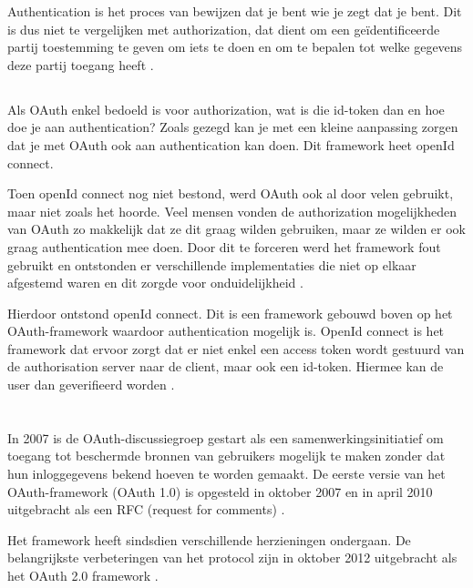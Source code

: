 Authentication is het proces van bewijzen dat je bent wie je zegt dat je bent. Dit is dus niet te vergelijken met authorization, dat dient om een geïdentificeerde partij toestemming te geven om iets te doen en om te bepalen tot welke gegevens deze partij toegang heeft \autocite{rwike772020}.

\subsection{}
Als OAuth enkel bedoeld is voor authorization, wat is die id-token dan en hoe doe je aan authentication? Zoals gezegd kan je met een kleine aanpassing zorgen dat je met OAuth ook aan authentication kan doen. Dit framework heet openId connect. \autocite{rwike772019} \autocite{rwike772019a}

Toen openId connect nog niet bestond, werd OAuth ook al door velen gebruikt, maar niet zoals het hoorde. Veel mensen vonden de authorization mogelijkheden van OAuth zo makkelijk dat ze dit graag wilden gebruiken, maar ze wilden er ook graag authentication mee doen. Door dit te forceren werd het framework fout gebruikt en ontstonden er verschillende implementaties die niet op elkaar afgestemd waren en dit zorgde voor onduidelijkheid \autocite{rwike772019} \autocite{rwike772019a}.

Hierdoor ontstond openId connect. Dit is een framework gebouwd boven op het OAuth-framework waardoor authentication mogelijk is. OpenId connect is het framework dat ervoor zorgt dat er niet enkel een access token wordt gestuurd van de authorisation server naar de client, maar ook een id-token. Hiermee kan de user dan geverifieerd worden \autocite{rwike772019} \autocite{rwike772019a}.

\section{}
\label{sec:OAuthHistory}
In 2007 is de OAuth-discussiegroep gestart als een samenwerkingsinitiatief om toegang tot beschermde bronnen van gebruikers mogelijk te maken zonder dat hun inloggegevens bekend hoeven te worden gemaakt. De eerste versie van het OAuth-framework (OAuth 1.0) is opgesteld in oktober 2007 en in april 2010 uitgebracht als een RFC (request for comments) \autocite{Chen2014}.

Het framework heeft sindsdien verschillende herzieningen ondergaan. De belangrijkste verbeteringen van het protocol zijn in oktober 2012 uitgebracht als het OAuth 2.0 framework \autocite{Chen2014}.

